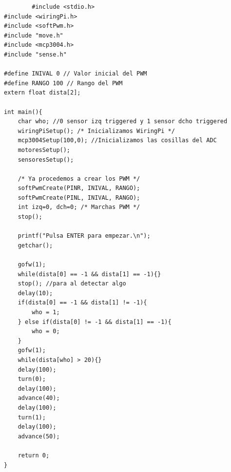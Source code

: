 \documentclass[11pt, a4paper]{article}
\begin{document}
	\begin{verbatim}
		#include <stdio.h>
#include <wiringPi.h>
#include <softPwm.h>
#include "move.h"
#include <mcp3004.h>
#include "sense.h"

#define INIVAL 0 // Valor inicial del PWM
#define RANGO 100 // Rango del PWM
extern float dista[2];

int main(){
    char who; //0 sensor izq triggered y 1 sensor dcho triggered
	wiringPiSetup(); /* Inicializamos WiringPi */
	mcp3004Setup(100,0); //Inicializamos las cosillas del ADC
    motoresSetup();
    sensoresSetup();
    
	/* Ya procedemos a crear los PWM */
	softPwmCreate(PINR, INIVAL, RANGO);
	softPwmCreate(PINL, INIVAL, RANGO);
	int izq=0, dch=0; /* Marchas PWM */
	stop();
    
	printf("Pulsa ENTER para empezar.\n");
	getchar();
    
	gofw(1);
	while(dista[0] == -1 && dista[1] == -1){}
	stop(); //para al detectar algo
    delay(10);
    if(dista[0] == -1 && dista[1] != -1){
        who = 1;
    } else if(dista[0] != -1 && dista[1] == -1){
        who = 0;
    }
    gofw(1);
    while(dista[who] > 20){}
	delay(100);
	turn(0);
    delay(100);
    advance(40);
    delay(100);
    turn(1);
    delay(100);
    advance(50);
    
	return 0;
}
	\end{verbatim}
\end{document}
